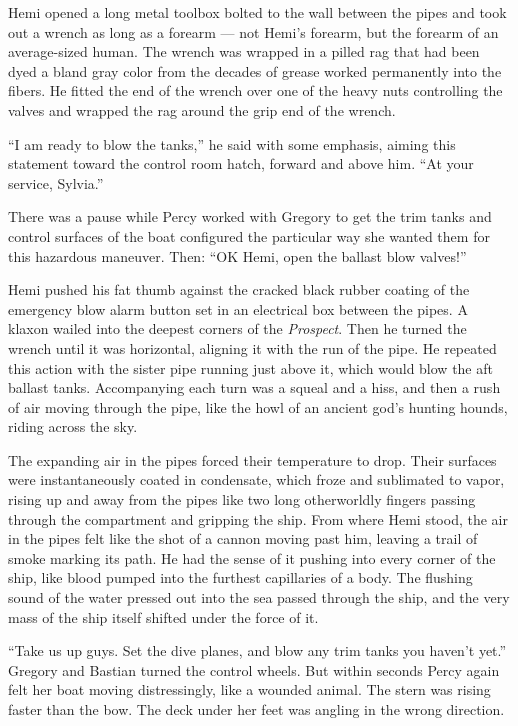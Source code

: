 \documentclass[
]{scrbook}
\begin{document}
Hemi opened a long metal toolbox bolted to the wall between the pipes
and took out a wrench as long as a forearm --- not Hemi's forearm, but
the forearm of an average-sized human. The wrench was wrapped in a
pilled rag that had been dyed a bland gray color from the decades of
grease worked permanently into the fibers. He fitted the end of the
wrench over one of the heavy nuts controlling the valves and wrapped the
rag around the grip end of the wrench.

``I am ready to blow the tanks,'' he said with some emphasis, aiming
this statement toward the control room hatch, forward and above him.
``At your service, Sylvia.''

There was a pause while Percy worked with Gregory to get the trim tanks
and control surfaces of the boat configured the particular way she
wanted them for this hazardous maneuver. Then: ``OK Hemi, open the
ballast blow valves!''

Hemi pushed his fat thumb against the cracked black rubber coating of
the emergency blow alarm button set in an electrical box between the
pipes. A klaxon wailed into the deepest corners of the \emph{Prospect}.
Then he turned the wrench until it was horizontal, aligning it with the
run of the pipe. He repeated this action with the sister pipe running
just above it, which would blow the aft ballast tanks. Accompanying each
turn was a squeal and a hiss, and then a rush of air moving through the
pipe, like the howl of an ancient god's hunting hounds, riding across
the sky.

The expanding air in the pipes forced their temperature to drop. Their
surfaces were instantaneously coated in condensate, which froze and
sublimated to vapor, rising up and away from the pipes like two long
otherworldly fingers passing through the compartment and gripping the
ship. From where Hemi stood, the air in the pipes felt like the shot of
a cannon moving past him, leaving a trail of smoke marking its path. He
had the sense of it pushing into every corner of the ship, like blood
pumped into the furthest capillaries of a body. The flushing sound of
the water pressed out into the sea passed through the ship, and the very
mass of the ship itself shifted under the force of it.

``Take us up guys. Set the dive planes, and blow any trim tanks you
haven't yet.'' Gregory and Bastian turned the control wheels. But within
seconds Percy again felt her boat moving distressingly, like a wounded
animal. The stern was rising faster than the bow. The deck under her
feet was angling in the wrong direction.
\end{document}
